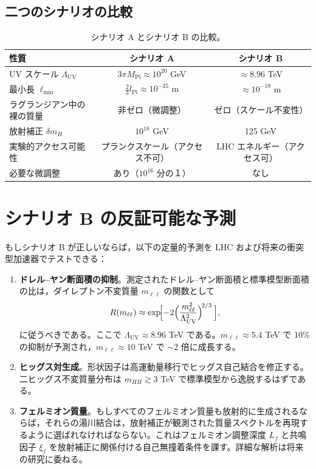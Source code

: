 \documentclass[11pt,a4paper]{article}
\newcommand{\Mpl}{M_{\mathrm{Pl}}}
\newcommand{\Lpl}{l_{\mathrm{Pl}}}
\newcommand{\Lmin}{\ell_{\min}}
\newcommand{\LUV}{\Lambda_{\mathrm{UV}}}
\theoremstyle{remark}
\begin{document}
	\subsection{二つのシナリオの比較}
	
	\begin{table}[H]
		\centering
		\caption{シナリオ A とシナリオ B の比較。}
		\label{tab:scenarios}
		\small
		\begin{tabular}{@{}lcc@{}}
			\toprule
			\textbf{性質} & \textbf{シナリオ A} & \textbf{シナリオ B} \\
			\midrule
			UV スケール \(\LUV\) & \(3\pi\Mpl \approx 10^{20}\) GeV & \(\approx 8.96\) TeV \\
			最小長 \(\Lmin\) & \(\frac{2}{3}\Lpl \approx 10^{-35}\) m & \(\approx 10^{-19}\) m \\
			ラグランジアン中の裸の質量 & 非ゼロ（微調整） & ゼロ（スケール不変性） \\
			放射補正 \(\delta m_H\) & \(10^{18}\) GeV & 125 GeV \\
			実験的アクセス可能性 & プランクスケール（アクセス不可） & LHC エネルギー（アクセス可） \\
			必要な微調整 & あり（\(10^{16}\) 分の１） & なし \\
			\bottomrule
		\end{tabular}
	\end{table}
	
	\section{シナリオ B の反証可能な予測}
	\label{sec:predictions}
	
	もしシナリオ B が正しいならば，以下の定量的予測を LHC および将来の衝突型加速器でテストできる：
	
	\begin{enumerate}[label=(\arabic*)]
		\item \textbf{ドレル–ヤン断面積の抑制}。測定されたドレル–ヤン断面積と標準模型断面積の比は，ダイレプトン不変質量 \(m_{\ell\ell}\) の関数として
		\[
		R(m_{\ell\ell}) \approx \exp\!\Bigl[-2\Bigl(\frac{m_{\ell\ell}^2}{\LUV^2}\Bigr)^{\!2/3}\,\Bigr],
		\]
		に従うべきである。ここで \(\LUV \approx 8.96\) TeV である。\(m_{\ell\ell} \approx 5.4\) TeV で 10\% の抑制が予測され，\(m_{\ell\ell} \approx 10\) TeV で \(\sim 2\) 倍に成長する。
		
		\item \textbf{ヒッグス対生成}。形状因子は高運動量移行でヒッグス自己結合を修正する。二ヒッグス不変質量分布は \(m_{HH} \gtrsim 3\) TeV で標準模型から逸脱するはずである。
		
		\item \textbf{フェルミオン質量}。もしすべてのフェルミオン質量も放射的に生成されるならば，それらの湯川結合は，放射補正が観測された質量スペクトルを再現するように選ばれなければならない。これはフェルミオン調整深度 \(L_f\) と共鳴因子 \(\xi_f\) を放射補正に関係付ける自己無撞着条件を課す。詳細な解析は将来の研究に委ねる。
	\end{enumerate}
	
\end{document}

